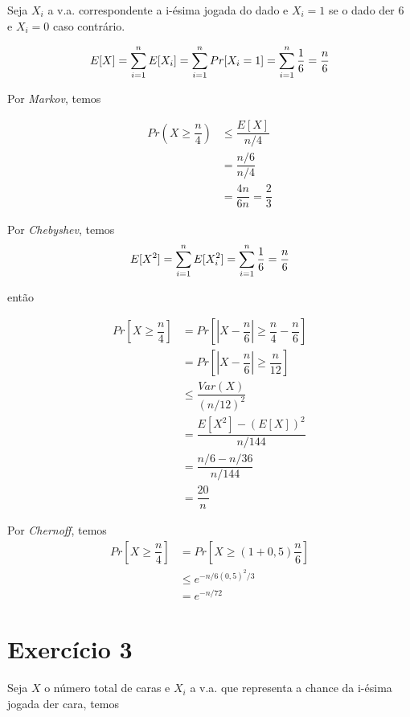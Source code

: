 \documentclass{article}
\begin{document}
Seja $X_i$ a v.a. correspondente a i-ésima jogada do dado e $X_i = 1$ se o dado der 6 e $X_i = 0$ caso contrário.

\begin{equation}
	\notag
	E[X] = \sum\limits_{i=1}^nE[X_i] = \sum\limits_{i=1}^n Pr[X_i = 1] =  \sum\limits_{i=1}^n \dfrac{1}{6} = \dfrac{n}{6}
\end{equation}

Por \emph{Markov}, temos

\begin{equation}
	\begin{split}
		Pr\left(X \geq \dfrac{n}{4}\right) &\leq \dfrac{E[X]}{n/4}\\
		&= \dfrac{n/6}{n/4}\\
		&= \dfrac{4n}{6n} = \dfrac{2}{3}
	\end{split}
\end{equation}

Por \emph{Chebyshev}, temos
\begin{equation}
\notag
	E[X^2] = \sum\limits_{i=1}^nE[X_i^2] = \sum\limits_{i=1}^n\dfrac{1}{6} = \dfrac{n}{6}
\end{equation}

então

\begin{equation}
	\begin{split}
		Pr\left[X \geq \dfrac{n}{4}\right] &= Pr\left[|X - \dfrac{n}{6}|\geq \dfrac{n}{4} - \dfrac{n}{6}\right]\\
		&= Pr\left[|X - \dfrac{n}{6}|\geq \dfrac{n}{12}\right]\\
		&\leq \dfrac{Var(X)}{(n/12)^2}\\
		&=\dfrac{E[X^2] - (E[X])^2}{n/144}\\
		&= \dfrac{n/6 - n/36}{n/144}\\
		&= \dfrac{20}{n}
	\end{split}
\end{equation}

Por \emph{Chernoff}, temos
\begin{equation}
	\begin{split}
		Pr\left[X \geq \dfrac{n}{4} \right] &= Pr\left[X \geq (1+0,5)\dfrac{n}{6} \right]\\
		&\leq e^{-n/6(0,5)^2/3}\\
		&= e^{-n/72}
	\end{split}
\end{equation}

\section{Exercício 3}
Seja $X$ o número total de caras e $X_i$ a v.a. que representa a chance da i-ésima 
jogada der cara, temos\\
\end{document}
